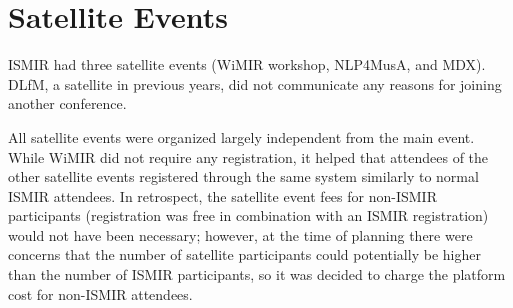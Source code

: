 \documentclass[%
10pt,								%
titlepage,						%
]
{scrartcl}
\begin{document}
\section{Satellite Events}
    ISMIR had three satellite events (WiMIR workshop, NLP4MusA, and MDX). DLfM, a satellite in previous years, did not communicate any reasons for joining another conference.

    All satellite events were organized largely independent from the main event. While WiMIR did not require any registration, it helped that attendees of the other satellite events registered through the same system similarly to normal ISMIR attendees. In retrospect, the satellite event fees for non-ISMIR participants (registration was free in combination with an ISMIR registration) would not have been necessary; however, at the time of planning there were concerns that the number of satellite participants could potentially be higher than the number of ISMIR participants, so it was decided to charge the platform cost for non-ISMIR attendees.

      
\end{document}
